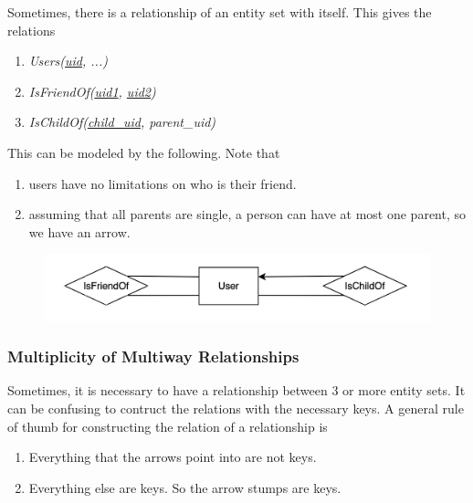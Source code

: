 \documentclass{article}
\begin{document}
      \begin{example}
        Sometimes, there is a relationship of an entity set with itself. This gives the relations 
        \begin{enumerate}
          \item \textit{Users(\underline{uid}, ...)} 
          \item \textit{IsFriendOf(\underline{uid1}, \underline{uid2})} 
          \item \textit{IsChildOf(\underline{child\_uid}, parent\_uid)}
        \end{enumerate}
        This can be modeled by the following. Note that 
        \begin{enumerate}
          \item users have no limitations on who is their friend. 
          \item assuming that all parents are single, a person can have at most one parent, so we have an arrow.  
        \end{enumerate}
        \begin{figure}[H]
          \centering 
          \includegraphics[scale=0.3]{img/within_itself.png}
          \caption{} 
          \label{fig:within_itself}
        \end{figure}
      \end{example}

    \subsubsection{Multiplicity of Multiway Relationships}

      Sometimes, it is necessary to have a relationship between 3 or more entity sets. It can be confusing to contruct the relations with the necessary keys. A general rule of thumb for constructing the relation of a relationship is 
      \begin{enumerate}
        \item Everything that the arrows point into are not keys.   
        \item Everything else are keys. So the arrow stumps are keys. 
      \end{enumerate}
\end{document}
